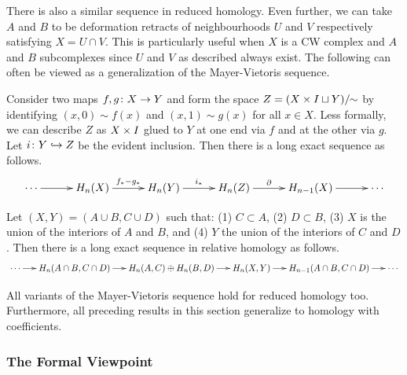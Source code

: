 There is also a similar sequence in reduced homology. Even further, we can take $A$ and $B$ to be deformation retracts of neighbourhoods $U$ and $V$ respectively satisfying $X = U \cap V$. This is particularly useful when $X$ is a CW complex and $A$ and $B$ subcomplexes since $U$ and $V$ as described always exist. The following can often be viewed as a generalization of the Mayer-Vietoris sequence.

\begin{theorem}
  Consider two maps $f, g \colon X \rightarrow Y$ and form the space $Z = (X \times I \sqcup Y)/\!\!\sim$ by identifying $(x,0) \sim f(x)$ and $(x,1) \sim g(x)$ for all $x \in X$. Less formally, we can describe $Z$ as $X \times I$ glued to $Y$ at one end via $f$ and at the other via $g$. Let $i \colon Y \hookrightarrow Z$ be the evident inclusion. Then there is a long exact sequence as follows.
  \[\xymatrix@C=0.4in{
    \cdots \ar[r] & H_n(X) \ar[r]^-{f_\ast - g_\ast} & H_n(Y) \ar[r]^-{i_\ast} & H_n(Z) \ar[r]^-\d & H_{n-1}(X) \ar[r] & \cdots
  }\]
\end{theorem}

\begin{theorem}
  Let $(X,Y) = (A \cup B, C \cup D)$ such that: (1) $C \subset A$, (2) $D \subset B$, (3) $X$ is the union of the interiors of $A$ and $B$, and (4) $Y$ the union of the interiors of $C$ and $D$. Then there is a long exact sequence in relative homology as follows.
  \[\xymatrix@C=0.2in{
    \cdots \ar[r] & H_n(A \cap B, C \cap D) \ar[r] & H_n(A,C) \oplus H_n(B,D) \ar[r] & H_n(X,Y) \ar[r] & H_{n-1}(A \cap B, C \cap D) \ar[r] & \cdots
  }\]
\end{theorem}

All variants of the Mayer-Vietoris sequence hold for reduced homology too. Furthermore, all preceding results in this section generalize to homology with coefficients.

\subsubsection{The Formal Viewpoint}

